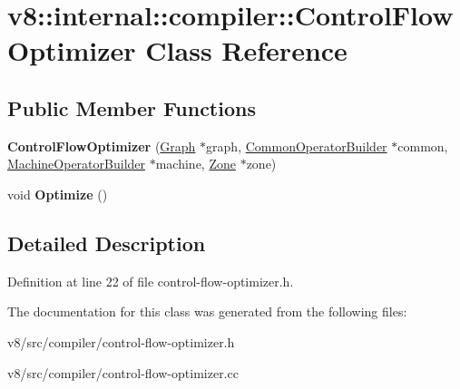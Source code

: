 \hypertarget{classv8_1_1internal_1_1compiler_1_1ControlFlowOptimizer}{}\section{v8\+:\+:internal\+:\+:compiler\+:\+:Control\+Flow\+Optimizer Class Reference}
\label{classv8_1_1internal_1_1compiler_1_1ControlFlowOptimizer}
\subsection*{Public Member Functions}
\begin{DoxyCompactItemize}
\item 
\mbox{\label{classv8_1_1internal_1_1compiler_1_1ControlFlowOptimizer_ae4209d872f5980178890a25123cffba9}} 
{\bfseries Control\+Flow\+Optimizer} (\mbox{\hyperlink{classv8_1_1internal_1_1compiler_1_1Graph}{Graph}} $\ast$graph, \mbox{\hyperlink{classv8_1_1internal_1_1compiler_1_1CommonOperatorBuilder}{Common\+Operator\+Builder}} $\ast$common, \mbox{\hyperlink{classv8_1_1internal_1_1compiler_1_1MachineOperatorBuilder}{Machine\+Operator\+Builder}} $\ast$machine, \mbox{\hyperlink{classv8_1_1internal_1_1Zone}{Zone}} $\ast$zone)
\item 
\mbox{\label{classv8_1_1internal_1_1compiler_1_1ControlFlowOptimizer_ac7d2f4952d504013f9748cdf7ae24abc}} 
void {\bfseries Optimize} ()
\end{DoxyCompactItemize}


\subsection{Detailed Description}


Definition at line 22 of file control-\/flow-\/optimizer.\+h.



The documentation for this class was generated from the following files\+:\begin{DoxyCompactItemize}
\item 
v8/src/compiler/control-\/flow-\/optimizer.\+h\item 
v8/src/compiler/control-\/flow-\/optimizer.\+cc\end{DoxyCompactItemize}
